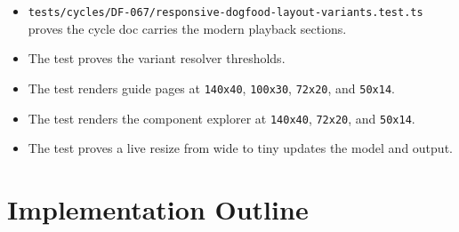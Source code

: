 \begin{itemize}
\tightlist
\item
  \texttt{t\allowbreak{}e\allowbreak{}s\allowbreak{}t\allowbreak{}s\allowbreak{}/\allowbreak{}c\allowbreak{}y\allowbreak{}c\allowbreak{}l\allowbreak{}e\allowbreak{}s\allowbreak{}/\allowbreak{}D\allowbreak{}F\allowbreak{}-\allowbreak{}0\allowbreak{}6\allowbreak{}7\allowbreak{}/\allowbreak{}r\allowbreak{}e\allowbreak{}s\allowbreak{}p\allowbreak{}o\allowbreak{}n\allowbreak{}s\allowbreak{}i\allowbreak{}v\allowbreak{}e\allowbreak{}-\allowbreak{}d\allowbreak{}o\allowbreak{}g\allowbreak{}f\allowbreak{}o\allowbreak{}o\allowbreak{}d\allowbreak{}-\allowbreak{}l\allowbreak{}a\allowbreak{}y\allowbreak{}o\allowbreak{}u\allowbreak{}t\allowbreak{}-\allowbreak{}v\allowbreak{}a\allowbreak{}r\allowbreak{}i\allowbreak{}a\allowbreak{}n\allowbreak{}t\allowbreak{}s\allowbreak{}.\allowbreak{}t\allowbreak{}e\allowbreak{}s\allowbreak{}t\allowbreak{}.\allowbreak{}t\allowbreak{}s} proves the cycle doc carries the modern playback sections.
\item
  The test proves the variant resolver thresholds.
\item
  The test renders guide pages at \texttt{1\allowbreak{}4\allowbreak{}0\allowbreak{}x\allowbreak{}4\allowbreak{}0}, \texttt{1\allowbreak{}0\allowbreak{}0\allowbreak{}x\allowbreak{}3\allowbreak{}0}, \texttt{7\allowbreak{}2\allowbreak{}x\allowbreak{}2\allowbreak{}0}, and \texttt{5\allowbreak{}0\allowbreak{}x\allowbreak{}1\allowbreak{}4}.
\item
  The test renders the component explorer at \texttt{1\allowbreak{}4\allowbreak{}0\allowbreak{}x\allowbreak{}4\allowbreak{}0}, \texttt{7\allowbreak{}2\allowbreak{}x\allowbreak{}2\allowbreak{}0}, and \texttt{5\allowbreak{}0\allowbreak{}x\allowbreak{}1\allowbreak{}4}.
\item
  The test proves a live resize from wide to tiny updates the model and output.
\end{itemize}

\section{Implementation Outline}\label{record-108-implementation-outline}

